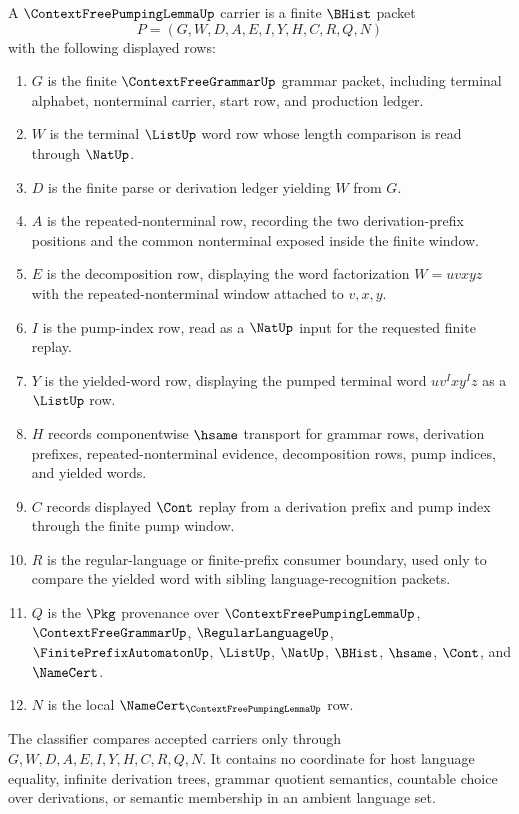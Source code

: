 \begin{definition}
\label{def:context-free-pumping-lemma-namecert-carrier}
A $\ContextFreePumpingLemmaUp$ carrier is a finite $\BHist$ packet
$$
P=(G,W,D,A,E,I,Y,H,C,R,Q,N)
$$
with the following displayed rows:
\begin{enumerate}
\item $G$ is the finite $\ContextFreeGrammarUp$ grammar packet, including terminal alphabet, nonterminal carrier, start row, and production ledger.
\item $W$ is the terminal $\ListUp$ word row whose length comparison is read through $\NatUp$.
\item $D$ is the finite parse or derivation ledger yielding $W$ from $G$.
\item $A$ is the repeated-nonterminal row, recording the two derivation-prefix positions and the common nonterminal exposed inside the finite window.
\item $E$ is the decomposition row, displaying the word factorization $W=u v x y z$ with the repeated-nonterminal window attached to $v,x,y$.
\item $I$ is the pump-index row, read as a $\NatUp$ input for the requested finite replay.
\item $Y$ is the yielded-word row, displaying the pumped terminal word $u v^I x y^I z$ as a $\ListUp$ row.
\item $H$ records componentwise $\hsame$ transport for grammar rows, derivation prefixes, repeated-nonterminal evidence, decomposition rows, pump indices, and yielded words.
\item $C$ records displayed $\Cont$ replay from a derivation prefix and pump index through the finite pump window.
\item $R$ is the regular-language or finite-prefix consumer boundary, used only to compare the yielded word with sibling language-recognition packets.
\item $Q$ is the $\Pkg$ provenance over $\ContextFreePumpingLemmaUp$, $\ContextFreeGrammarUp$, $\RegularLanguageUp$, $\FinitePrefixAutomatonUp$, $\ListUp$, $\NatUp$, $\BHist$, $\hsame$, $\Cont$, and $\NameCert$.
\item $N$ is the local $\NameCert_{\ContextFreePumpingLemmaUp}$ row.
\end{enumerate}
The classifier compares accepted carriers only through $G,W,D,A,E,I,Y,H,C,R,Q,N$. It contains no coordinate for host language equality, infinite derivation trees, grammar quotient semantics, countable choice over derivations, or semantic membership in an ambient language set.
\end{definition}

